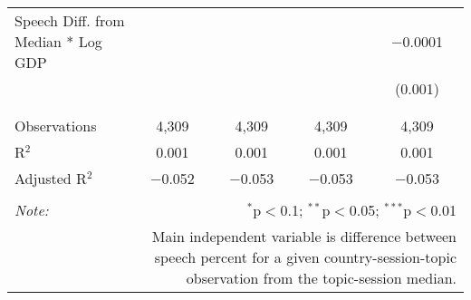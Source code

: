 \begin{table}[!htbp]
\begin{tabular}{@{\extracolsep{5pt}}lcccc}
 Speech Diff. from Median * Log GDP &  &  &  & $-$0.0001 \\ 
  &  &  &  & (0.001) \\ 
  & & & & \\ 
\hline \\[-1.8ex] 
Observations & 4,309 & 4,309 & 4,309 & 4,309 \\ 
R$^{2}$ & 0.001 & 0.001 & 0.001 & 0.001 \\ 
Adjusted R$^{2}$ & $-$0.052 & $-$0.053 & $-$0.053 & $-$0.053 \\ 
\hline 
\hline \\[-1.8ex] 
\textit{Note:}  & \multicolumn{4}{r}{$^{*}$p$<$0.1; $^{**}$p$<$0.05; $^{***}$p$<$0.01} \\ 
 & \multicolumn{4}{r}{Main independent variable is difference between speech percent for a given country-session-topic observation from the topic-session median.} \\ 
\end{tabular} 
\end{table} 
